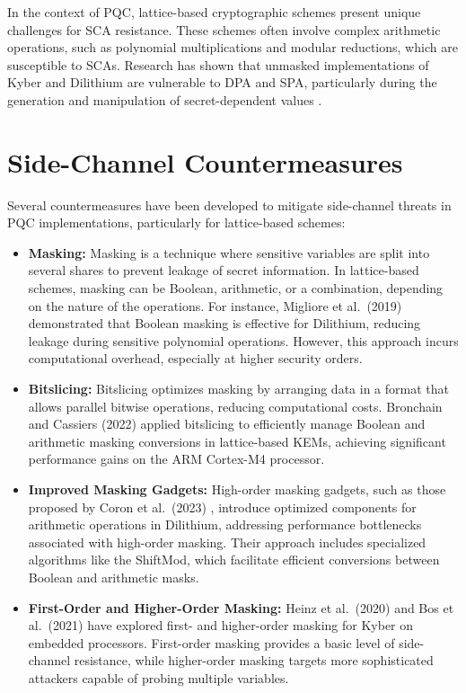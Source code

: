 In the context of \ac{PQC}, lattice-based cryptographic schemes present unique challenges for \ac{SCA} resistance. These schemes often involve complex arithmetic operations, such as polynomial multiplications and modular reductions, which are susceptible to \acp{SCA}. Research has shown that unmasked implementations of Kyber and Dilithium are vulnerable to \ac{DPA} and \ac{SPA}, particularly during the generation and manipulation of secret-dependent values \cite{Bos21}.

\section{Side-Channel Countermeasures}

Several countermeasures have been developed to mitigate side-channel threats in \ac{PQC} implementations, particularly for lattice-based schemes:

\begin{itemize}
    \item \textbf{Masking:} Masking is a technique where sensitive variables are split into several shares to prevent leakage of secret information. In lattice-based schemes, masking can be Boolean, arithmetic, or a combination, depending on the nature of the operations. For instance, Migliore et al.\ (2019) \cite{Migliore19} demonstrated that Boolean masking is effective for Dilithium, reducing leakage during sensitive polynomial operations. However, this approach incurs computational overhead, especially at higher security orders.
    \item \textbf{Bitslicing:} Bitslicing optimizes masking by arranging data in a format that allows parallel bitwise operations, reducing computational costs. Bronchain and Cassiers (2022) \cite{Bronchain22} applied bitslicing to efficiently manage Boolean and arithmetic masking conversions in lattice-based \acp{KEM}, achieving significant performance gains on the \ac{ARM} Cortex-M4 processor.
    \item \textbf{Improved Masking Gadgets:} High-order masking gadgets, such as those proposed by Coron et al.\ (2023) \cite{Coron23}, introduce optimized components for arithmetic operations in Dilithium, addressing performance bottlenecks associated with high-order masking. Their approach includes specialized algorithms like the ShiftMod, which facilitate efficient conversions between Boolean and arithmetic masks.
    \item \textbf{First-Order and Higher-Order Masking:} Heinz et al.\ (2020) \cite{Heinz20} and Bos et al.\ (2021) \cite{Bos21} have explored first- and higher-order masking for Kyber on embedded processors. First-order masking provides a basic level of side-channel resistance, while higher-order masking targets more sophisticated attackers capable of probing multiple variables.
\end{itemize}

